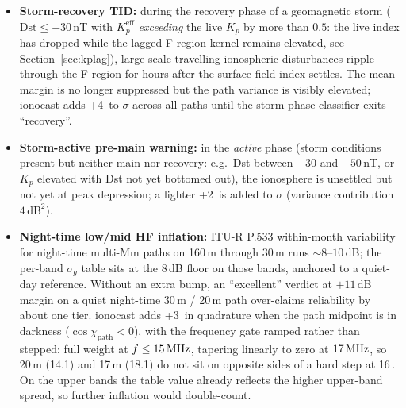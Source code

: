 \documentclass[11pt,a4paper]{article}
\newcommand{\SI}[2]{#1\,\text{#2}}
\newcommand{\dB}{\text{dB}}
\newcommand{\MHz}{\text{MHz}}
\begin{document}
\begin{itemize}[nosep]
        quadrature to the per-band $\sigma_g^2$).  Above $|\cos\chi|
        \ge 0.20$ the contribution is zero; in the
        $|\cos\chi| \in [0.15, 0.20]$ band the variance contribution
        ramps linearly from $9\,\text{dB}^2$ down to $0$, matching
        the smooth-ramp philosophy applied at every other gate
        (auroral $c(\phi)$, Bz bump, twilight $r(\cos\chi_k)$,
        near-MUF, Es threshold) and avoiding a tier-confidence
        cliff at terminator approach.
  \item \textbf{Storm-recovery TID:} during the recovery phase of a
        geomagnetic storm ($\text{Dst} \le -30$\,nT with
        $K_p^{\text{eff}}$ \emph{exceeding} the live $K_p$ by more
        than $0.5$: the live index has dropped while the lagged
        F-region kernel remains elevated, see
        Section~\ref{sec:kplag}),
        large-scale travelling ionospheric disturbances ripple
        through the F-region for hours after the surface-field
        index settles.  The mean margin is no longer suppressed but
        the path variance is visibly elevated; ionocast adds
        \SI{+4}{\dB} to $\sigma$ across all paths until the storm
        phase classifier exits ``recovery''.
  \item \textbf{Storm-active pre-main warning:} in the
        \emph{active} phase (storm conditions present but neither
        main nor recovery: e.g.\ Dst between $-30$ and
        $-50$\,nT, or $K_p$ elevated with Dst not yet bottomed
        out), the ionosphere is unsettled but not yet at peak
        depression; a lighter \SI{+2}{\dB} is added to $\sigma$
        (variance contribution $4\,\text{dB}^2$).
  \item \textbf{Night-time low/mid HF inflation:} ITU-R P.533
        within-month variability for night-time multi-Mm paths on
        160\,m through 30\,m runs ${\sim}\!8\text{--}10$\,dB; the
        per-band $\sigma_g$ table sits at the 8\,dB floor on those
        bands, anchored to a quiet-day reference.  Without an extra
        bump, an ``excellent'' verdict at $+11$\,dB margin on a
        quiet night-time 30\,m / 20\,m path over-claims reliability
        by about one tier.  ionocast adds \SI{+3}{\dB} in
        quadrature when the path midpoint is in darkness
        ($\cos\chi_{\text{path}} < 0$), with the frequency gate
        ramped rather than stepped: full weight at
        $f \le \SI{15}{\MHz}$, tapering linearly to zero at
        $\SI{17}{\MHz}$, so 20\,m (14.1) and 17\,m (18.1) do not
        sit on opposite sides of a hard step at
        \SI{16}{\MHz}.  On the upper bands the table
        value already reflects the higher
        upper-band spread, so further inflation would
        double-count.
\end{itemize}
\end{document}
